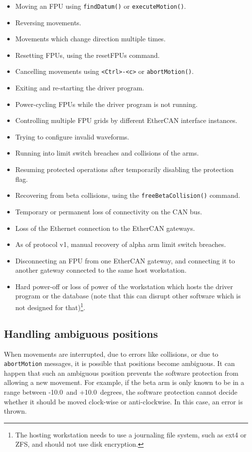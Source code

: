 \documentclass[11pt,a4paper]{report}
\begin{document}
\begin{itemize}
\item Moving an FPU using \texttt{findDatum()} or \texttt{executeMotion()}.
\item Reversing movements.
\item Movements which change direction multiple times.
\item Resetting FPUs, using the resetFPUs command.
\item Cancelling movements using \verb+<Ctrl>-<c>+ or \texttt{abortMotion()}.
\item Exiting and re-starting the driver program.
\item Power-cycling FPUs while the driver program is not running.
\item Controlling multiple FPU grids by different EtherCAN interface instances.
\item Trying to configure invalid waveforms.
\item Running into limit switch breaches and collisions of the arms.
\item Resuming protected operations after temporarily disabling the
  protection flag.
\item Recovering from beta collisions, using the
  \texttt{freeBetaCollision()} command.
\item Temporary or permanent loss of connectivity on the CAN bus.
\item Loss of the Ethernet connection to the EtherCAN gateways.
\item As of protocol v1, manual recovery of alpha arm limit switch
  breaches.
\item Disconnecting an FPU from one EtherCAN gateway, and connecting
  it to another gateway connected to the same host workstation. 
\item Hard power-off or loss of power of the workstation which hosts
  the driver program or the database (note that this can disrupt other
  software which is not designed for that)\footnote{The hosting
    workstation needs to use a journaling file system, such as ext4 or
    ZFS, and should not use disk encryption.}.
\end{itemize}

\subsection{Handling ambiguous positions}
%
When movements are interrupted, due to errors like
collisions, or due to \texttt{abortMotion} messages, it is possible
that positions become ambiguous. It can happen that such an ambiguous
position prevents the software protection from allowing a new
movement.  For example, if the beta arm is only known to be in a range
between -10.0\degree\ and +10.0\degree\ degrees, the software protection cannot decide
whether it should be moved clock-wise or anti-clockwise. In this case,
an error is thrown.
\end{document}
